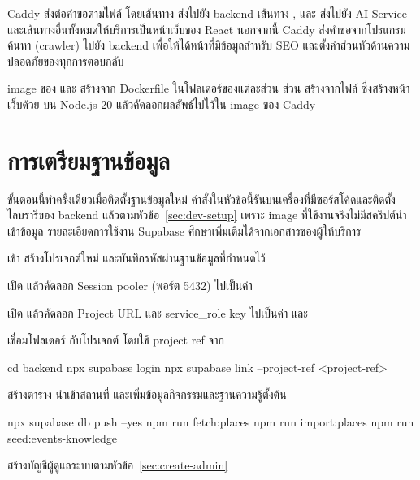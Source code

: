 Caddy ส่งต่อคำขอตามไฟล์  โดยเส้นทาง  ส่งไปยัง backend เส้นทาง ,  และ  ส่งไปยัง AI Service และเส้นทางอื่นทั้งหมดให้บริการเป็นหน้าเว็บของ React นอกจากนี้ Caddy ส่งคำขอจากโปรแกรมค้นหา (crawler) ไปยัง backend เพื่อให้ได้หน้าที่มีข้อมูลสำหรับ SEO และตั้งค่าส่วนหัวด้านความปลอดภัยของทุกการตอบกลับ

image ของ  และ  สร้างจาก Dockerfile ในโฟลเดอร์ของแต่ละส่วน ส่วน  สร้างจากไฟล์  ซึ่งสร้างหน้าเว็บด้วย  บน Node.js 20 แล้วคัดลอกผลลัพธ์ไปไว้ใน image ของ Caddy

\section{การเตรียมฐานข้อมูล}
\label{sec:db-setup}

ขั้นตอนนี้ทำครั้งเดียวเมื่อติดตั้งฐานข้อมูลใหม่ คำสั่งในหัวข้อนี้รันบนเครื่องที่มีซอร์สโค้ดและติดตั้งไลบรารีของ backend แล้วตามหัวข้อ~\ref{sec:dev-setup} เพราะ image ที่ใช้งานจริงไม่มีสคริปต์นำเข้าข้อมูล รายละเอียดการใช้งาน Supabase ศึกษาเพิ่มเติมได้จากเอกสารของผู้ให้บริการ~\cite{supabase2026}

\begin{steps}
  \item เข้า  สร้างโปรเจกต์ใหม่ และบันทึกรหัสผ่านฐานข้อมูลที่กำหนดไว้
  \item เปิด  แล้วคัดลอก Session pooler (พอร์ต 5432) ไปเป็นค่า 
  \item เปิด  แล้วคัดลอก Project URL และ service\_role key ไปเป็นค่า  และ 
  \item เชื่อมโฟลเดอร์  กับโปรเจกต์ โดยใช้ project ref จาก 
\begin{terminal}
cd backend
npx supabase login
npx supabase link --project-ref <project-ref>
\end{terminal}
  \item สร้างตาราง นำเข้าสถานที่ และเพิ่มข้อมูลกิจกรรมและฐานความรู้ตั้งต้น
\begin{terminal}
npx supabase db push --yes
npm run fetch:places
npm run import:places
npm run seed:events-knowledge
\end{terminal}
  \item สร้างบัญชีผู้ดูแลระบบตามหัวข้อ~\ref{sec:create-admin}
\end{steps}


